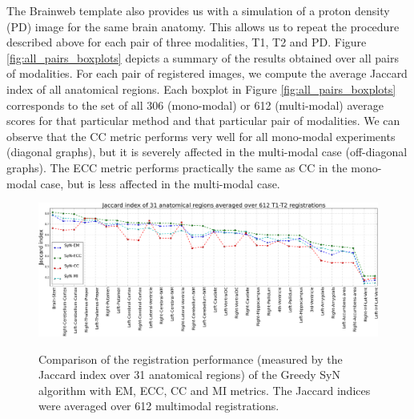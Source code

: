 The Brainweb template also provides us with a simulation of a proton density (PD) image for the same brain anatomy. This allows us to repeat the procedure described above for each pair of three modalities, T1, T2 and PD. Figure \ref{fig:all_pairs_boxplots} depicts a summary of the results obtained over all pairs of modalities. For each pair of registered images, we compute the average Jaccard index of all anatomical regions. Each boxplot in Figure \ref{fig:all_pairs_boxplots} corresponds to the set of all 306 (mono-modal) or 612 (multi-modal) average scores for that particular method and that particular pair of modalities. We can observe that the CC metric performs very well for all mono-modal experiments (diagonal graphs), but it is severely affected in the multi-modal case (off-diagonal graphs). The ECC metric performs practically the same as CC in the mono-modal case, but is less affected in the multi-modal case.
%
%

\begin{figure}[t!]
\centering
\includegraphics[width=1.0\linewidth]{./images/multi_lines_seg.png}\\
\caption{{\small Comparison of the registration performance (measured by the Jaccard index over 31 anatomical regions) of the Greedy SyN algorithm with EM, ECC, CC and MI metrics. The Jaccard indices were averaged over 612 multimodal registrations.}}
\label{fig:multi_seg}\figcloser
\end{figure}

